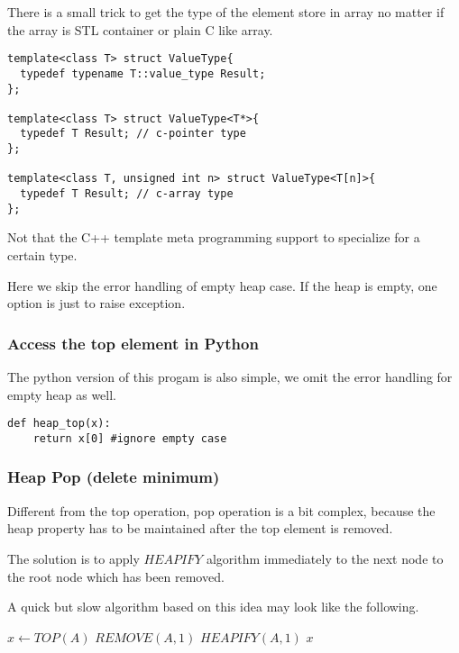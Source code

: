 \documentclass{article}
\begin{document}
There is a small trick to get the type of the element store in 
array no matter if the array is STL container or plain C like
array.

\begin{lstlisting}
template<class T> struct ValueType{
  typedef typename T::value_type Result;
};

template<class T> struct ValueType<T*>{
  typedef T Result; // c-pointer type
};

template<class T, unsigned int n> struct ValueType<T[n]>{
  typedef T Result; // c-array type
};
\end{lstlisting}

Not that the C++ template meta programming support to
specialize for a certain type.

Here we skip the error handling of empty heap case. If the 
heap is empty, one option is just to raise exception.

\subsubsection*{Access the top element in Python}

The python version of this progam is also simple, we omit
the error handling for empty heap as well.

\lstset{language=C++}
\begin{lstlisting}
def heap_top(x):
    return x[0] #ignore empty case
\end{lstlisting}

\subsubsection{Heap Pop (delete minimum)}

Different from the top operation, pop operation is a bit
complex, because the heap property has to be maintained
after the top element is removed.

The solution is to apply $HEAPIFY$ algorithm immediately to the
next node to the root node which has been removed.

A quick but slow algorithm based on this idea may look like
the following.

\begin{algorithmic}[1]
  \State $x \gets TOP(A)$
  \State $REMOVE(A, 1)$
    \State $HEAPIFY(A, 1)$
  \EndIf
  \State \Return $x$
\EndFunction
\end{algorithmic}
\end{document}
